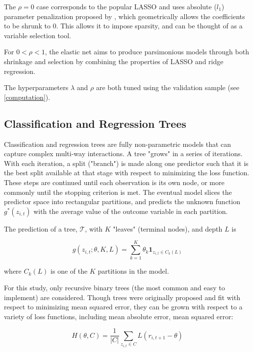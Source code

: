\documentclass[a4paper, table]{article}
\begin{document}
The $\rho = 0$ case corresponds to the popular LASSO and uses absolute ($l_1$) parameter penalization proposed by \cite{tibshirani_regression_1996}, which geometrically allows the coefficients to be shrunk to 0. This allows it to impose sparsity, and can be thought of as a variable selection tool.

For \(0 < \rho < 1\), the elastic net aims to produce parsimonious models through both shrinkage and selection by combining the properties of LASSO and ridge regression.

The hyperparameters $\lambda$ and $\rho$ are both tuned using the validation sample (see \ref{computation}). 

\subsection{Classification and Regression Trees}

Classification and regression trees are fully non-parametric models that can capture complex multi-way interactions. A tree "grows" in a series of iterations. With each iteration, a split ("branch") is made along one predictor such that it is the best split available at that stage with respect to minimizing the loss function. These steps are continued until each observation is its own node, or more commonly until the stopping criterion is met. The eventual model slices the predictor space into rectangular partitions, and predicts the unknown function $g^*(z_{i,t})$ with the average value of the outcome variable in each partition.

The prediction of a tree, $\mathcal{T}$, with \(K\) "leaves" (terminal nodes), and depth $L$ is

\begin{equation}
	g(z_{i,t};\theta,K,L) = \sum_{k=1}^{K}\theta_k\textbf{1}_{z_{i,t}\in C_k(L)}
\end{equation}

where $C_k(L)$ is one of the $K$ partitions in the model.

For this study, only recursive binary trees (the most common and easy to implement) are considered. Though trees were originally proposed and fit with respect to minimizing mean squared error, they can be grown with respect to a variety of loss functions, including mean absolute error, mean squared error:

\begin{equation}
	H(\theta, C) = \frac{1}{|C|} \sum_{z_{i,t} \in C} L(r_{i,t+1} - \theta)
\end{equation}
\end{document}
